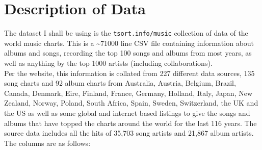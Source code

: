 \documentclass[12pt]{article}
\begin{document}
  \maketitle
  \tableofcontents
  \pagebreak

  \section{Description of Data}
  The dataset I shall be using is the \verb|tsort.info/music| collection of data of the world music charts. 
  This is a \textasciitilde 71000 line CSV file containing information about albums and songs, recording the top 100 songs and albums from most years, as well as anything by the top 1000 artists (including collaborations). 
  \\
  Per the website, this information is collated from 227 different data sources, 135 song charts and 92 album charts from Australia, Austria, Belgium, Brazil, Canada, Denmark, Eire, Finland, France, Germany, Holland, Italy, Japan, New Zealand, Norway, Poland, South Africa, Spain, Sweden, Switzerland, the UK and the US as well as some global and internet based listings to give the songs and albums that have topped the charts around the world for the last 116 years. The source data includes all the hits of 35,703 song artists and 21,867 album artists. 
  The columns are as follows:
\end{document}
